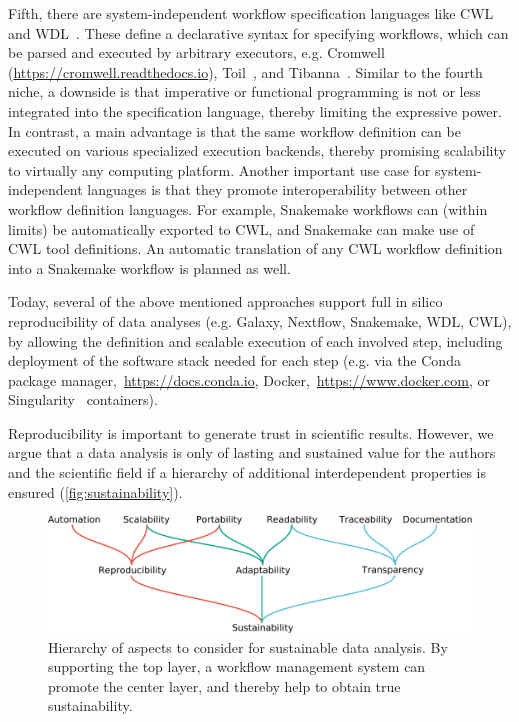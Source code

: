 \documentclass[10pt,a4paper,twocolumn]{article}
\let\plainurl\url
\renewcommand{\url}[1]{\protect\plainurl{#1}}
\begin{document}
Fifth, there are system-independent workflow specification languages like CWL~\parencite{cwl} and WDL~\parencite{voss_full-stack_2017}.
These define a declarative syntax for specifying workflows, which can be parsed and executed by arbitrary executors, e.g. Cromwell (\url{https://cromwell.readthedocs.io}), Toil~\parencite{Vivian_2017}, and Tibanna~\parencite{Lee_2019}.
Similar to the fourth niche, a downside is that imperative or functional programming is not or less integrated into the specification language, thereby limiting the expressive power.
In contrast, a main advantage is that the same workflow definition can be executed on various specialized execution backends, thereby promising scalability to virtually any computing platform.
Another important use case for system-independent languages is that they promote interoperability between other workflow definition languages.
For example, Snakemake workflows can (within limits) be automatically exported to CWL, and Snakemake can make use of CWL tool definitions.
An automatic translation of any CWL workflow definition into a Snakemake workflow is planned as well.

Today, several of the above mentioned approaches support full in silico reproducibility of data analyses (e.g. Galaxy, Nextflow, Snakemake, WDL, CWL), by allowing the definition and scalable execution of each involved step, including deployment of the software stack needed for each step (e.g. via the Conda package manager,~\url{https://docs.conda.io}, Docker,~\url{https://www.docker.com}, or Singularity~\parencite{kurtzer_singularity_2017} containers).

Reproducibility is important to generate trust in scientific results.
However, we argue that a data analysis is only of lasting and sustained value for the authors and the scientific field if a hierarchy of additional interdependent properties is ensured (\autoref{fig:sustainability}).

\begin{figure}
    \centering
	\includegraphics[width=\columnwidth]{sustainability-in-wms.pdf}
	\caption{
		Hierarchy of aspects to consider for sustainable data analysis.
		By supporting the top layer, a workflow management system can promote the center layer, and thereby help to obtain true sustainability.
	}\label{fig:sustainability}
\end{figure}
\end{document}
